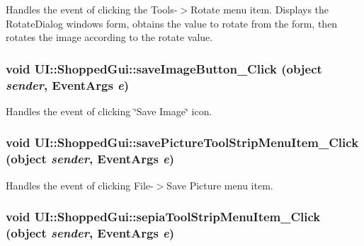 \label{class_u_i_1_1_shopped_gui_a8b4824c0552bcfe814bbf8437cb87ec2}
Handles the event of clicking the Tools-\/$>$Rotate menu item. Displays the RotateDialog windows form, obtains the value to rotate from the form, then rotates the image according to the rotate value. \hypertarget{class_u_i_1_1_shopped_gui_a205444f0fff14792394724b4eb22601d}{
\subsubsection[{saveImageButton\_\-Click}]{\setlength{\rightskip}{0pt plus 5cm}void UI::ShoppedGui::saveImageButton\_\-Click (object {\em sender}, \/  EventArgs {\em e})}}
\label{class_u_i_1_1_shopped_gui_a205444f0fff14792394724b4eb22601d}
Handles the event of clicking \char`\"{}Save Image\char`\"{} icon. \hypertarget{class_u_i_1_1_shopped_gui_a79d60e553769283f7b9ec8af7a9d3dc1}{
\subsubsection[{savePictureToolStripMenuItem\_\-Click}]{\setlength{\rightskip}{0pt plus 5cm}void UI::ShoppedGui::savePictureToolStripMenuItem\_\-Click (object {\em sender}, \/  EventArgs {\em e})}}
\label{class_u_i_1_1_shopped_gui_a79d60e553769283f7b9ec8af7a9d3dc1}
Handles the event of clicking File-\/$>$Save Picture menu item. \hypertarget{class_u_i_1_1_shopped_gui_a533354a0b2f7d07821793de2faca3e9e}{
\subsubsection[{sepiaToolStripMenuItem\_\-Click}]{\setlength{\rightskip}{0pt plus 5cm}void UI::ShoppedGui::sepiaToolStripMenuItem\_\-Click (object {\em sender}, \/  EventArgs {\em e})}}
